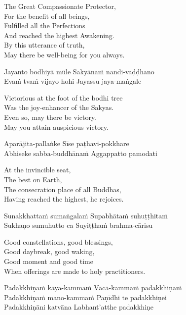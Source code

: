 \begin{english}
  The Great Compassionate Protector,\\
  For the benefit of all beings,\\
  Fulfilled all the Perfections\\
  And reached the highest Awakening.\\
  By this utterance of truth,\\
  May there be well-being for you always.
\end{english}

Jayanto bodhiyā mūle Sakyānaṁ nandi-vaḍḍhano\\
Evaṁ tvaṁ vijayo hohi Jayassu jaya-maṅgale

\begin{english}
  Victorious at the foot of the bodhi tree\\
  Was the joy-enhancer of the Sakyas.\\
  Even so, may there be victory.\\
  May you attain auspicious victory.
\end{english}

Aparājita-pallaṅke Sīse paṭhavi-pokkhare\\
Abhiseke sabba-buddhānaṁ Aggappatto pamodati

\begin{english}
  At the invincible seat,\\
  The best on Earth,\\
  The consecration place of all Buddhas,\\
  Having reached the highest, he rejoices.
\end{english}

\suttaRef{[MJG]}

Sunakkhattaṁ sumaṅgalaṁ Supabhātaṁ suhuṭṭhitaṁ\\
Sukhaṇo sumuhutto ca Suyiṭṭhaṁ brahma-cārisu

\begin{english}
  Good constellations, good blessings,\\
  Good daybreak, good waking,\\
  Good moment and good time\\
  When offerings are made to holy practitioners.
\end{english}

Padakkhiṇaṁ kāya-kammaṁ Vācā-kammaṁ padakkhiṇaṁ\\
Padakkhiṇaṁ mano-kammaṁ Paṇīdhi te padakkhiṇei\\
Padakkhiṇāni katvāna Labhant’atthe padakkhiṇe

